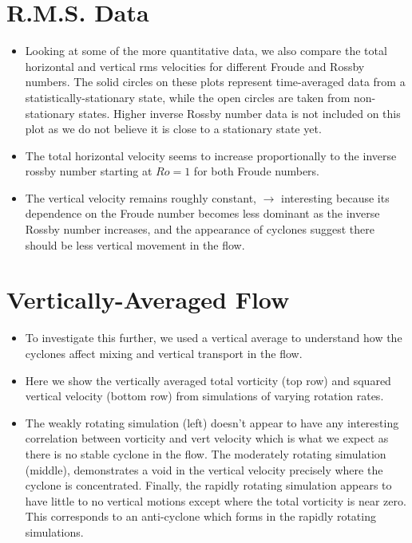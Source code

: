 \documentclass{article}
\begin{document}
\section{R.M.S. Data}
\begin{itemize}
    \item Looking at some of the more quantitative data, we also compare the
    total horizontal and vertical rms velocities for different Froude and Rossby
    numbers. The solid circles on these plots represent time-averaged data from
    a statistically-stationary state, while the open circles are taken from
    non-stationary states. Higher inverse Rossby number data is not included on
    this plot as we do not believe it is close to a stationary state yet. 
    \item The total horizontal velocity seems to increase proportionally to the 
    inverse rossby number starting at $Ro = 1$ for both Froude numbers. 
    \item The vertical velocity remains roughly constant, $\to$ interesting
    because its dependence on the Froude number becomes less
    dominant as the inverse Rossby number increases, and the appearance of
    cyclones suggest there should be less vertical movement in the flow.
\end{itemize}

\section{Vertically-Averaged Flow}
\begin{itemize}
    \item To investigate this further, we used a vertical average to
    understand how the cyclones affect mixing and vertical transport in the flow. 
    \item Here we show the vertically averaged total vorticity (top row) and
    squared vertical velocity (bottom row) from simulations of varying rotation
    rates. 
    \item The weakly rotating simulation (left) doesn't appear to have any interesting
    correlation between vorticity and vert velocity which is what we expect as
    there is no stable cyclone in the flow. The moderately rotating simulation
    (middle), demonstrates a void in the vertical velocity precisely where the
    cyclone is concentrated. Finally, the rapidly rotating simulation appears to
    have little to no vertical motions except where the total vorticity is near
    zero. This corresponds to an anti-cyclone which forms in the rapidly
    rotating simulations. 
\end{itemize}
\end{document}
